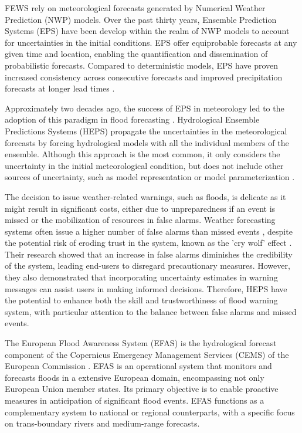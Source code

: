 \documentclass[preprint,12pt,authoryear]{elsarticle}
\begin{document}
FEWS rely on meteorological forecasts generated by Numerical Weather Prediction (NWP) models. Over the past thirty years, Ensemble Prediction Systems (EPS) have been develop within the realm of NWP models to account for uncertainties in the initial conditions. EPS offer equiprobable forecasts at any given time and location, enabling the quantification and dissemination of probabilistic forecasts. Compared to deterministic models, EPS have proven increased consistency across consecutive forecasts \cite{Buizza2008} and improved precipitation forecasts at longer lead times \cite{Molteni1996}.

Approximately two decades ago, the success of EPS in meteorology led to the adoption of this paradigm in flood forecasting \cite{Diomede2008, Bartholmes2009, Thielen2009a, Yang2020}. Hydrological Ensemble Predictions Systems (HEPS) propagate the uncertainties in the meteorological forecasts by forcing hydrological models with all the individual members of the ensemble. Although this approach is the most common, it only considers the uncertainty in the initial meteorological condition, but does not include other sources of uncertainty, such as model representation or model parameterization \cite{Cloke2009}. 

The decision to issue weather-related warnings, such as floods, is delicate as it might result in significant costs, either due to unpreparedness if an event is missed or the mobilization of resources in false alarms. Weather forecasting systems often issue a higher number of false alarms than missed events \cite{Bouttier2023}, despite the potential risk of eroding trust in the system, known as the 'cry wolf' effect \cite{LeClerc2015}. Their research showed that an increase in false alarms diminishes the credibility of the system, leading end-users to disregard precautionary measures. However, they also demonstrated that incorporating uncertainty estimates in warning messages can assist users in making informed decisions. Therefore, HEPS have the potential to enhance both the skill and trustworthiness of flood warning system, with particular attention to the balance between false alarms and missed events.

The European Flood Awareness System (EFAS) is the hydrological forecast component of the Copernicus Emergency Management Services (CEMS) of the European Commission \cite{Thielen2009a}. EFAS is an operational system that monitors and forecasts floods in a extensive European domain, encompassing not only European Union member states. Its primary objective is to enable proactive measures in anticipation of significant flood events. EFAS functions as a complementary system to national or regional counterparts, with a specific focus on trans-boundary rivers and medium-range forecasts. 
\end{document}
